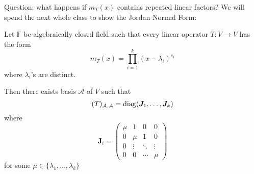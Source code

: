 Question: what happens if $m_T(x)$ contains repeated linear factors?
We will spend the next whole class to show the Jordan Normal Form:
\begin{theorem}
Let $\mathbb{F}$ be algebraically closed field such that every linear operator $T:V\to V$ has the form
\[
m_T(x) = \prod_{i=1}^k(x-\lambda_i)^{e_i}
\]
where $\lambda_i$'s are distinct.

Then there exists basis $\mathcal{A}$ of $V$ such that
\[
(T)_{\mathcal{A},\mathcal{A}}
=
\operatorname{diag}(\bm J_1,\dots,\bm J_k)
\]
where
\[
\bm J_i=\begin{pmatrix}
\mu&1&0&0\\
0&\mu&1&0\\
0&\vdots&\ddots&\vdots\\
0&0&\cdots&\mu
\end{pmatrix}
\]
for some $\mu\in\{\lambda_1,\dots,\lambda_k\}$
\end{theorem}










